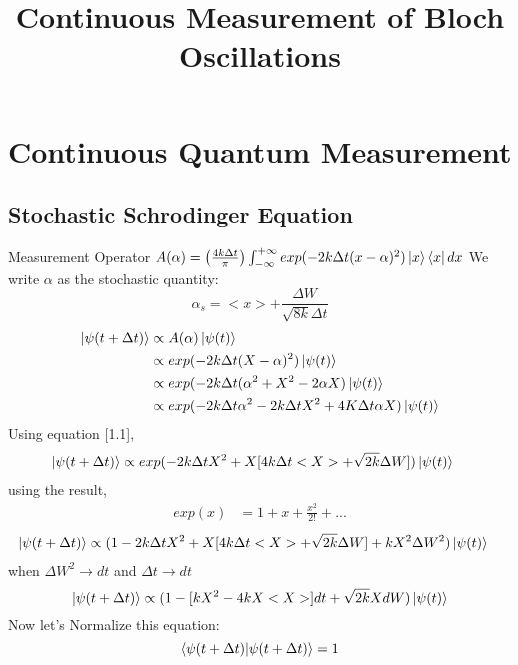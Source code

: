 \documentclass{homeworg}
\title{ Continuous Measurement of
	Bloch Oscillations}
\begin{document}
\maketitle
\tableofcontents
\newpage
{}

	
	
	
	
	
	
	
\section{Continuous Quantum Measurement}
\subsection{Stochastic Schrodinger Equation}
Measurement Operator $A(\alpha) = \left(\frac{4k\Delta t}{\pi}\right)\int_{-\infty}^{+\infty} exp (-2k\Delta t (x-\alpha)^2) \ket  x \bra x dx$
We write $\alpha$ as the stochastic quantity:
\begin{equation}
\alpha_s = <x> + \frac{\Delta W}{\sqrt{8 k} \Delta t}
\end{equation}
\begin{align}
\ket{\psi (t + \Delta t)} &\propto A(\alpha)\ket{\psi (t)}\\
&\propto exp (-2k\Delta t (X-\alpha)^2)\ket{\psi (t)}\\
&\propto exp (-2k\Delta t (\alpha^2 + X^2 - 2 \alpha X)\ket{\psi (t)}\\
&\propto exp (-2k\Delta t \alpha^2 - 2k\Delta t X^2 + 4K\Delta t \alpha X)\ket{\psi (t)}
\end{align}
Using equation [1.1],
\begin{align}
\ket{\psi (t + \Delta t)} &\propto exp(-2k\Delta t X^2 + X[4k\Delta t <X> +\sqrt{2k }\Delta W])\ket{\psi (t)}
\end{align}
using the result, 
\begin{align}
exp (x)&= 1+x+\frac{x^2}{2!}+...
\end{align}
\begin{align}
\ket{\psi (t + \Delta t)} &\propto (1-2k\Delta t X^2 + X[4k\Delta t <X> +\sqrt{2k}\Delta W]+kX^2\Delta W^2)\ket{\psi (t)}
\end{align}
when $\Delta W^2 \to dt$ and $\Delta t \to dt $
\begin{equation}
\ket{\psi (t + \Delta t)} \propto ({1-[kX^2 - 4kX<X>]dt +\sqrt{2k}XdW})\ket{\psi (t)}
\end{equation}
Now let's Normalize this equation: 
\begin{equation}
\bra{\psi (t + \Delta t)}\ket{\psi (t + \Delta t)} = 1
\end{equation}
\end{document}
